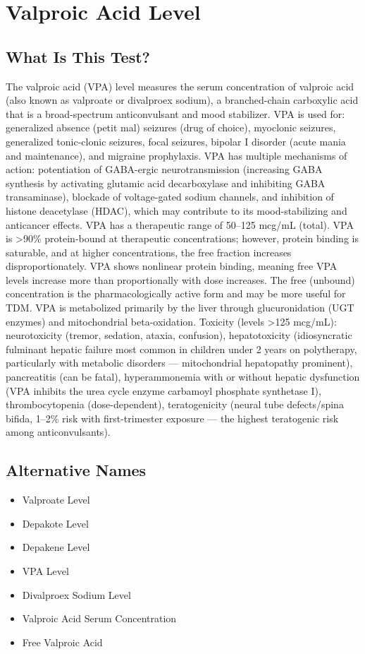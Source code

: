 \chapter{Valproic Acid Level}
\section*{What Is This Test?}
The valproic acid (VPA) level measures the serum concentration of valproic acid (also known as valproate or divalproex sodium), a branched-chain carboxylic acid that is a broad-spectrum anticonvulsant and mood stabilizer. VPA is used for: generalized absence (petit mal) seizures (drug of choice), myoclonic seizures, generalized tonic-clonic seizures, focal seizures, bipolar I disorder (acute mania and maintenance), and migraine prophylaxis. VPA has multiple mechanisms of action: potentiation of GABA-ergic neurotransmission (increasing GABA synthesis by activating glutamic acid decarboxylase and inhibiting GABA transaminase), blockade of voltage-gated sodium channels, and inhibition of histone deacetylase (HDAC), which may contribute to its mood-stabilizing and anticancer effects. VPA has a therapeutic range of 50--125 mcg/mL (total). VPA is >90\% protein-bound at therapeutic concentrations; however, protein binding is saturable, and at higher concentrations, the free fraction increases disproportionately. VPA shows nonlinear protein binding, meaning free VPA levels increase more than proportionally with dose increases. The free (unbound) concentration is the pharmacologically active form and may be more useful for TDM. VPA is metabolized primarily by the liver through glucuronidation (UGT enzymes) and mitochondrial beta-oxidation. Toxicity (levels >125 mcg/mL): neurotoxicity (tremor, sedation, ataxia, confusion), hepatotoxicity (idiosyncratic fulminant hepatic failure most common in children under 2 years on polytherapy, particularly with metabolic disorders --- mitochondrial hepatopathy prominent), pancreatitis (can be fatal), hyperammonemia with or without hepatic dysfunction (VPA inhibits the urea cycle enzyme carbamoyl phosphate synthetase I), thrombocytopenia (dose-dependent), teratogenicity (neural tube defects/spina bifida, 1--2\% risk with first-trimester exposure --- the highest teratogenic risk among anticonvulsants).
\section*{Alternative Names}
\begin{itemize}
  \item Valproate Level
  \item Depakote Level
  \item Depakene Level
  \item VPA Level
  \item Divalproex Sodium Level
  \item Valproic Acid Serum Concentration
  \item Free Valproic Acid
\end{itemize}
